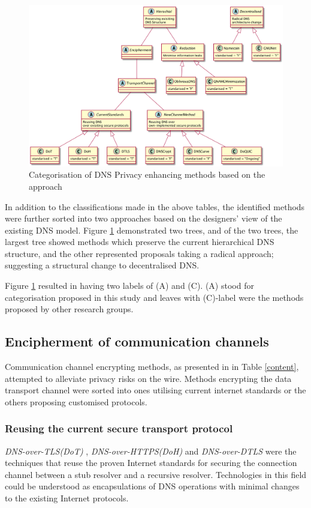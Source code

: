\begin{figure}[h!]
    \begin{center}
    \includegraphics*[width=1\columnwidth]{img/dnsprivacy-classification}
    \end{center}
    \caption{Categorisation of DNS Privacy enhancing methods based on the approach}
    \label{dns-methods-classification}
\end{figure}

In addition to the classifications made in the above tables, the identified methods were further sorted into two approaches based on the designers' view of the existing DNS model.
Figure \ref{dns-methods-classification} demonstrated two trees, and of the two trees, the largest tree showed methods which preserve the current hierarchical DNS structure, and the other represented proposals taking a radical approach; suggesting a structural change to decentralised DNS.

Figure \ref{dns-methods-classification} resulted in having two labels of (A) and (C). (A) stood for categorisation proposed in this study and leaves with (C)-label were the methods proposed by other research groups.  

\subsection{Encipherment of communication channels}
Communication channel encrypting methods, as presented in in Table \ref{content}, attempted to alleviate privacy risks on the wire.
Methods encrypting the data transport channel were sorted into ones utilising current internet standards or the others proposing customised protocols.
\subsubsection{Reusing the current secure transport protocol}
\textit{DNS-over-TLS(DoT)} \cite{rfc7858}, \textit{DNS-over-HTTPS(DoH)} \cite{rfc8484} and \textit{DNS-over-DTLS} \cite{rfc8094} were the techniques that reuse the proven Internet standards for securing the connection channel between a stub resolver and a recursive resolver.
Technologies in this field could be understood as encapsulations of DNS operations with minimal changes to the existing Internet protocols.

